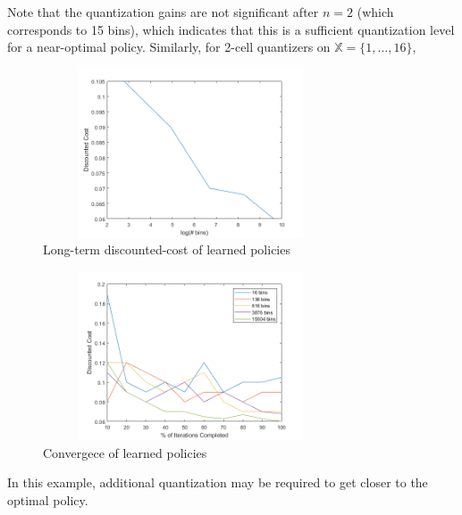 \documentclass[conference, draftcls, onecolumn]{IEEEtran}
\begin{document}
Note that the quantization gains are not significant after \( n=2 \) (which corresponds to 15 bins), which indicates that this is a sufficient quantization level for a near-optimal policy.
\newpage
Similarly, for 2-cell quantizers on \( \mathbb{X} = \{1,\ldots,16\} \),
\vspace{-1em}
\begin{figure}[H]
    \centering
    \includegraphics[height=5cm, width=8.75cm]{cost_16.png}
    \caption{Long-term discounted-cost of learned policies}
\end{figure}
\vspace{-1em}
\begin{figure}[H]
    \centering
    \includegraphics[height=5cm, width=8.75cm]{convergence_16.png}
    \caption{Convergece of learned policies}
\end{figure}

In this example, additional quantization may be required to get closer to the optimal policy.
\end{document}
